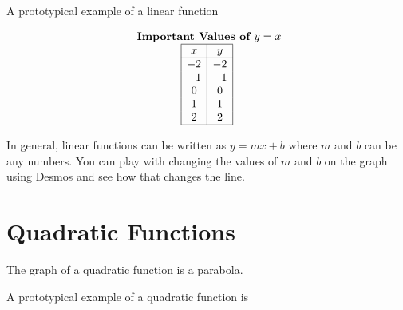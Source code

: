 \documentclass[nooutcomes]{ximera}
\begin{document}
A prototypical example of a linear function

\begin{image}
\end{image}

\begin{image}
\end{image}


\[
\begin{array}{  c  }
\text{\textbf{ Important Values of $y=x$}} \\
 \begin{array}{|c|c|}
 \hline
 x & y\\
 \hline
 -2&-2\\
 -1&-1\\
 0&0\\
 1&1\\
 2&2\\
 \hline
\end{array}
\end{array}
\]

In general, linear functions can be written as $y=mx+b$ where $m$ and $b$ can be any numbers.  You can play with changing the values of $m$ and $b$ on the graph using Desmos and see how that changes the line.  

\begin{center}  
\end{center}


\newpage


\section{Quadratic Functions}

The graph of a quadratic function is a parabola.

A prototypical example of a quadratic function is 
\end{document}
